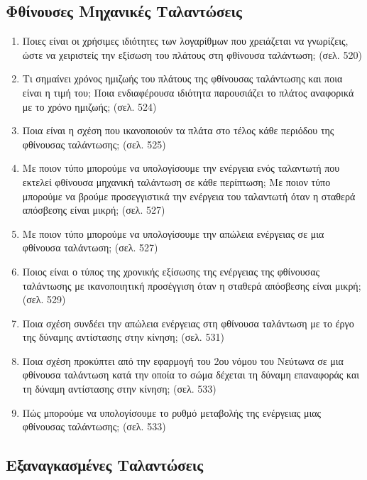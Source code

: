 \documentclass{article}
\begin{document}
\subsection{Φθίνουσες Μηχανικές Ταλαντώσεις}

\begin{enumerate}
      \item Ποιες είναι οι χρήσιμες ιδιότητες των λογαρίθμων που χρειάζεται να γνωρίζεις, ώστε να χειριστείς την εξίσωση του πλάτους στη φθίνουσα ταλάντωση; (σελ. 520)

      \item Τι σημαίνει χρόνος ημιζωής του πλάτους της φθίνουσας ταλάντωσης και ποια είναι η τιμή του; Ποια ενδιαφέρουσα ιδιότητα παρουσιάζει το πλάτος αναφορικά με το χρόνο ημιζωής; (σελ. 524)

      \item Ποια είναι η σχέση που ικανοποιούν τα πλάτα στο τέλος κάθε περιόδου της φθίνουσας ταλάντωσης; (σελ. 525)

      \item Με ποιον τύπο μπορούμε να υπολογίσουμε την ενέργεια ενός ταλαντωτή που εκτελεί φθίνουσα μηχανική ταλάντωση σε κάθε περίπτωση; Με ποιον τύπο μπορούμε να βρούμε προσεγγιστικά την ενέργεια του ταλαντωτή όταν η σταθερά απόσβεσης είναι μικρή; (σελ. 527)

      \item Με ποιον τύπο μπορούμε να υπολογίσουμε την απώλεια ενέργειας σε μια φθίνουσα ταλάντωση; (σελ. 527)

      \item Ποιος είναι ο τύπος της χρονικής εξίσωσης της ενέργειας της φθίνουσας ταλάντωσης με ικανοποιητική προσέγγιση όταν η σταθερά απόσβεσης είναι μικρή; (σελ. 529)

      \item Ποια σχέση συνδέει την απώλεια ενέργειας στη φθίνουσα ταλάντωση με το έργο της δύναμης αντίστασης στην κίνηση; (σελ. 531)

      \item Ποια σχέση προκύπτει από την εφαρμογή του 2ου νόμου του Νεύτωνα σε μια φθίνουσα ταλάντωση κατά την οποία το σώμα δέχεται τη δύναμη επαναφοράς και τη δύναμη αντίστασης στην κίνηση; (σελ. 533)

      \item Πώς μπορούμε να υπολογίσουμε το ρυθμό μεταβολής της ενέργειας μιας φθίνουσας ταλάντωσης; (σελ. 533)
\end{enumerate}

\subsection{Εξαναγκασμένες Ταλαντώσεις}
\end{document}
